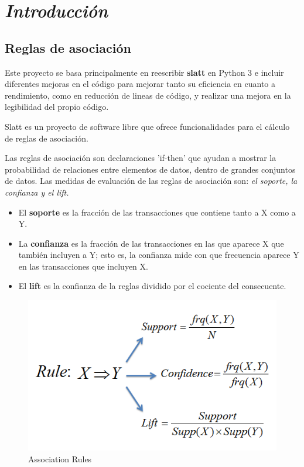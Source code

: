 \documentclass{cosas/tfg_domingo}
\begin{document}

\portada
\frontmatter
\gracias{}
\resumen{}{}
\tableofcontents

\mainmatter
\chapter{\emph{Introducción}}

\section{Reglas de asociación}

Este proyecto se basa principalmente en reescribir \textbf{slatt} en Python 3 e incluir diferentes mejoras en el código para mejorar tanto su eficiencia en cuanto a rendimiento, como en reducción de lineas de código, y realizar una mejora en la legibilidad del propio código.

Slatt es un proyecto de software libre que ofrece funcionalidades para el cálculo de reglas de asociación. 

Las reglas de asociación son declaraciones 'if-then' que ayudan a mostrar la probabilidad de relaciones entre elementos de datos, dentro de grandes conjuntos de datos. Las medidas de evaluación  de las reglas de asociación son: \textit{el soporte, la confianza y el lift.} 

\begin{itemize}
    \item El \textbf{soporte} es la fracción de las transacciones que contiene tanto a X como a Y. 
    \item La \textbf{confianza} es la fracción de las transacciones en las que aparece X que también incluyen a Y; esto es, la confianza mide con que frecuencia aparece Y en las transacciones que incluyen X.
    \item El \textbf{lift} es la confianza de la reglas dividido por el cociente del consecuente.
\end{itemize}

\begin{figure}[ht!] %
\begin{center}
\includegraphics[width=.49\linewidth]{imagenes/AR_1.png}
\end{center}
\caption{Association Rules}
\label{fig_pro}
\end{figure}
\end{document}
